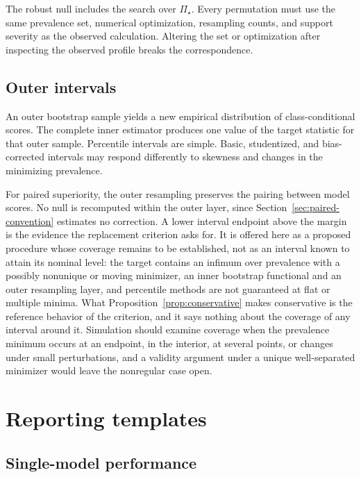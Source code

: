 \documentclass[11pt]{article}
\newcommand{\PSet}{\Pi_\star}
\theoremstyle{remark}
\begin{document}
The robust null includes the search over $\PSet$. Every permutation must use the same prevalence set, numerical optimization, resampling counts, and support severity as the observed calculation. Altering the set or optimization after inspecting the observed profile breaks the correspondence.

\subsection{Outer intervals}

An outer bootstrap sample yields a new empirical distribution of class-conditional scores. The complete inner estimator produces one value of the target statistic for that outer sample. Percentile intervals are simple. Basic, studentized, and bias-corrected intervals may respond differently to skewness and changes in the minimizing prevalence.

For paired superiority, the outer resampling preserves the pairing between model scores. No null is recomputed within the outer layer, since Section~\ref{sec:paired-convention} estimates no correction. A lower interval endpoint above the margin is the evidence the replacement criterion asks for. It is offered here as a proposed procedure whose coverage remains to be established, not as an interval known to attain its nominal level: the target contains an infimum over prevalence with a possibly nonunique or moving minimizer, an inner bootstrap functional and an outer resampling layer, and percentile methods are not guaranteed at flat or multiple minima. What Proposition~\ref{prop:conservative} makes conservative is the reference behavior of the criterion, and it says nothing about the coverage of any interval around it. Simulation should examine coverage when the prevalence minimum occurs at an endpoint, in the interior, at several points, or changes under small perturbations, and a validity argument under a unique well-separated minimizer would leave the nonregular case open.

\section{Reporting templates}
\label{app:report-template}

\subsection{Single-model performance}
\end{document}
